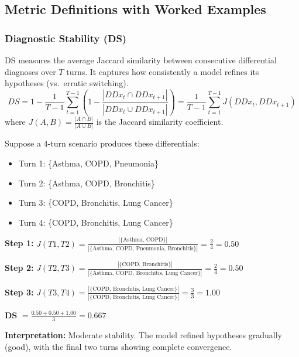 \subsection{Metric Definitions with Worked Examples}

\subsubsection{Diagnostic Stability (DS)}

\begin{acadbox}[\textcolor{white}{Academic Definition}]
DS measures the average Jaccard similarity between consecutive differential diagnoses over $T$ turns. It captures how consistently a model refines its hypotheses (vs.\ erratic switching).
\[
DS = 1 - \frac{1}{T-1} \sum_{t=1}^{T-1} \left(1 - \frac{|DDx_t \cap DDx_{t+1}|}{|DDx_t \cup DDx_{t+1}|}\right) = \frac{1}{T-1} \sum_{t=1}^{T-1} J(DDx_t, DDx_{t+1})
\]
where $J(A, B) = \frac{|A \cap B|}{|A \cup B|}$ is the Jaccard similarity coefficient.
\end{acadbox}

\begin{examplebox}[\textcolor{white}{Worked Example: Jaccard Similarity for DS}]
Suppose a 4-turn scenario produces these differentials:
\begin{itemize}
    \item Turn 1: \{Asthma, COPD, Pneumonia\}
    \item Turn 2: \{Asthma, COPD, Bronchitis\}
    \item Turn 3: \{COPD, Bronchitis, Lung Cancer\}
    \item Turn 4: \{COPD, Bronchitis, Lung Cancer\}
\end{itemize}

\textbf{Step 1:} $J(T1, T2) = \frac{|\{\text{Asthma, COPD}\}|}{|\{\text{Asthma, COPD, Pneumonia, Bronchitis}\}|} = \frac{2}{4} = 0.50$

\textbf{Step 2:} $J(T2, T3) = \frac{|\{\text{COPD, Bronchitis}\}|}{|\{\text{Asthma, COPD, Bronchitis, Lung Cancer}\}|} = \frac{2}{4} = 0.50$

\textbf{Step 3:} $J(T3, T4) = \frac{|\{\text{COPD, Bronchitis, Lung Cancer}\}|}{|\{\text{COPD, Bronchitis, Lung Cancer}\}|} = \frac{3}{3} = 1.00$

\textbf{DS} $= \frac{0.50 + 0.50 + 1.00}{3} = 0.667$

\textbf{Interpretation:} Moderate stability. The model refined hypotheses gradually (good), with the final two turns showing complete convergence.
\end{examplebox}

